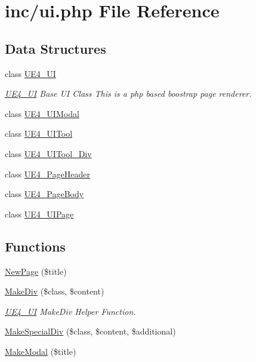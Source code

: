 \hypertarget{ui_8php}{\section{inc/ui.php File Reference}
\label{ui_8php}
}
\subsection*{Data Structures}
\begin{DoxyCompactItemize}
\item 
class \hyperlink{class_u_e4___u_i}{U\-E4\-\_\-\-U\-I}
\begin{DoxyCompactList}\small\item\em \hyperlink{class_u_e4___u_i}{U\-E4\-\_\-\-U\-I} Base U\-I Class This is a php based boostrap page renderer. \end{DoxyCompactList}\item 
class \hyperlink{class_u_e4___u_i_modal}{U\-E4\-\_\-\-U\-I\-Modal}
\item 
class \hyperlink{class_u_e4___u_i_tool}{U\-E4\-\_\-\-U\-I\-Tool}
\item 
class \hyperlink{class_u_e4___u_i_tool___div}{U\-E4\-\_\-\-U\-I\-Tool\-\_\-\-Div}
\item 
class \hyperlink{class_u_e4___page_header}{U\-E4\-\_\-\-Page\-Header}
\item 
class \hyperlink{class_u_e4___page_body}{U\-E4\-\_\-\-Page\-Body}
\item 
class \hyperlink{class_u_e4___u_i_page}{U\-E4\-\_\-\-U\-I\-Page}
\end{DoxyCompactItemize}
\subsection*{Functions}
\begin{DoxyCompactItemize}
\item 
\hyperlink{ui_8php_a16321ea290dabb36fceb18b44b356f81}{New\-Page} (\$title)
\item 
\hyperlink{ui_8php_a3a7f79b56cdc0ade41ad234bbfecfdff}{Make\-Div} (\$class, \$content)
\begin{DoxyCompactList}\small\item\em \hyperlink{class_u_e4___u_i}{U\-E4\-\_\-\-U\-I} Make\-Div Helper Function. \end{DoxyCompactList}\item 
\hyperlink{ui_8php_afbff87812db561076c0161ea6c943481}{Make\-Special\-Div} (\$class, \$content, \$additional)
\item 
\hyperlink{ui_8php_a1f02e65de4c564204fef7bd9118411bc}{Make\-Modal} (\$title)
\end{DoxyCompactItemize}


